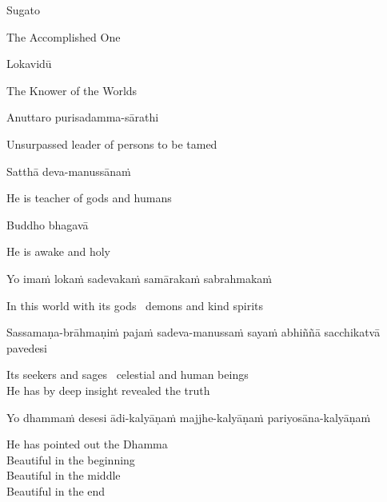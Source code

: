 Sugato

\begin{english}
  The Accomplished One
\end{english}

Lokavidū

\begin{english}
  The Knower of the Worlds
\end{english}

Anuttaro purisadamma-sārathi

\begin{english}
  Unsurpassed leader of persons to be tamed\makeatletter\hyperlink{endnote3-appendix}\makeatother
\end{english}

Satthā deva-manussānaṁ

\begin{english}
  He is teacher of gods and humans
\end{english}

Buddho bhagavā

\begin{english}
  He is awake and holy
\end{english}

Yo imaṁ lokaṁ sadevakaṁ samārakaṁ sabrahmakaṁ

\begin{english}
  In this world with its gods \breathmark\ demons and kind spirits
\end{english}

\begin{pali-hang}
  Sassamaṇa-brāhmaṇiṁ pajaṁ sadeva-manussaṁ sayaṁ abhiññā sacchikatvā pavedesi
\end{pali-hang}

\begin{english}
  Its seekers and sages \breathmark\ celestial and human beings\\
  He has by deep insight revealed the truth
\end{english}

\begin{pali-hang}
  Yo dhammaṁ desesi ādi-kalyāṇaṁ majjhe-kalyāṇaṁ pariyosāna-kalyāṇaṁ
\end{pali-hang}

\begin{english-verses}
  He has pointed out the Dhamma\\
  Beautiful in the beginning\\
  Beautiful in the middle\\
  Beautiful in the end\\
\end{english-verses}

